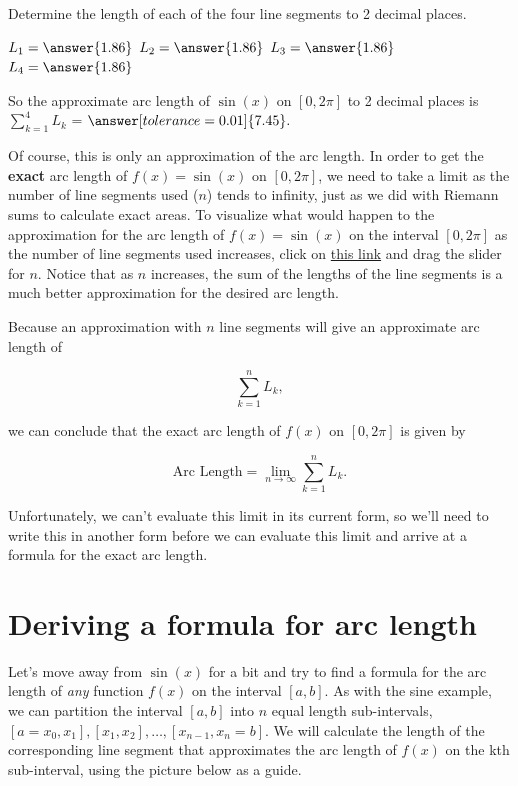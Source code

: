 \documentclass[handout,nooutcomes]{ximera}
\begin{document}

\begin{problem}
Determine the length of each of the four line segments to 2 decimal places.

$L_1 = \answer{1.86}$
$L_2 = \answer{1.86}$
$L_3 = \answer{1.86}$
$L_4 = \answer{1.86}$

So the approximate arc length of $\sin(x)$ on $[0, 2\pi]$ to 2 decimal places is $\displaystyle\sum_{k=1}^4 L_k$ = $\answer[tolerance=0.01]{7.45}.$
\end{problem}

Of course, this is only an approximation of the arc length.  In order to get the \textbf{exact} arc length of $f(x) = \sin(x)$ on $[0, 2\pi]$, we need to take a limit as the number of line segments used ($n$) tends to infinity, just as we did with Riemann sums to calculate exact areas.  To visualize what would happen to the approximation for the arc length of $f(x)=\sin(x)$ on the interval $[0,2\pi]$ as the number of line segments used increases, click on \href{https://www.desmos.com/calculator/lmz7n25cgl}{this link} and drag the slider for $n$.  Notice that as $n$ increases, the sum of the lengths of the line segments is a much better approximation for the desired arc length.

Because an approximation with $n$ line segments will give an approximate arc length of

\[
\displaystyle\sum_{k=1}^n L_k,
\]


we can conclude that the exact arc length of $f(x)$ on $[0, 2\pi]$ is given by

$$\text{Arc Length} = \displaystyle\lim_{n \to \infty} \displaystyle\sum_{k=1}^n L_k.$$

Unfortunately, we can't evaluate this limit in its current form, so we'll need to write this in another form before we can evaluate this limit and arrive at a formula for the exact arc length.  \\

\section {Deriving a formula for arc length}

Let's move away from $\sin(x)$ for a bit and try to find a formula for the arc length of \textit{any} function $f(x)$ on the interval $[a,b].$  As with the sine example, we can partition the interval $[a,b]$ into $n$ equal length sub-intervals, $[a=x_0, x_1], [x_1, x_2], \dots , [x_{n-1}, x_n = b].$  We will calculate the length of the corresponding line segment that approximates the arc length of $f(x)$ on the kth sub-interval, using the picture below as a guide.
\end{document}
